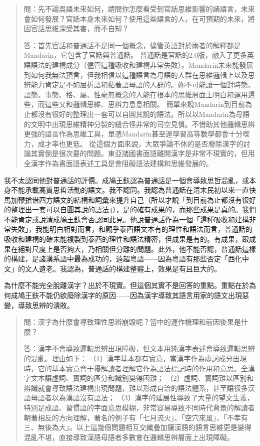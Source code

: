\documentclass[a5paper, 12pt, openany]{book} %
\begin{document}
\begin{quotation}
  問：先不論吳語未來如何，請問你怎麼看受到官話思維影響的諸語言，未來會如何發展？官話本身未來如何？使用這些語言的人，在可預期的未來，將因官話思維深受其害，而不自知？
  
  答：首先官話和普通話不是同一個概念，儘管英語對於兩者的解釋都是Mandarin，它包含了官話與普通話。
  普通話是官話的2.0版，融入了更多英語語法的建構成分（儘管這種吸收和建構非常失敗）。Mandarin未來能發展到如何我無法預言，但我相信以這種語言為母語的人群在思維邏輯上以及思辨能力肯定是不如屈折語和黏著語母語的人群的。妳不可能讓一個對時態、語態、事態、格、屬、性毫無概念的人能在根本的思維層面上明白和運用這些，而這些又和邏輯思維、思辨力息息相關。
  簡單來說Mandarin到目前為止都沒有很好的整理出一套可以自圓其說的語法。所以以Mandarin為母語的文明中出現思維精神分裂的縫合怪非常的司空見慣。不借助其他邏輯思辨更強的語言作為思維工具，單憑Mandarin甚至連學習高等數學都會十分喫力，成才率也更低。
  從這個方面來說，大眾爭論不休的是否廢除漢字的討論其實倒是很次要的問題。東亞諸國書面語離開漢字是非常不現實的，但用全漢字作為書面語表述工具是會阻礙語法建構和思維發展的。 
\end{quotation}

我不太認同他對普通話的評價。成鳩王鈇認為普通話是一個會導致思哲混亂，或本身不能承載高質思哲活動的語文。我不認同。我認為普通話在清末民初以來一直快馬加鞭搶借西方語文的結構和詞彙來提升自己（所以才說「到目前為止都沒有很好的整理出一套可以自圓其說的語法」），是的確有成果的，而那些成果是真的。我們不能肯定或說清成鳩王鈇會否認同此見。他說普通話作為一個「這種吸收和建構非常失敗」，我能明白相對而言，和觀乎泰西語文本有的理性和語法而言，普通話的吸收和建構的確未能複製到泰西的理性和語法精密，但成果是有的。有成果，跟成果在絕對尺度上是否夠大，乃相關但分離的問題。此外，他不能否認，普通話這樣的構建，是諸漢系語中最為成功的，遠超粵語——因為粵語有那些否定「西化中文」的文人遺老。我認為，普通話的構建整體上，效果是有且巨大的。

為什麼不能完全脫離漢字？出於不現實。但這個其實不是回答的重點。重點在於為何成鳩王鈇不能仍欲廢除漢字的原因——因為漢字導致其語言用家的語文出現惡變，導致思辨的潰敗。

\begin{quotation}
問：漢字為什麼會導致理性思辨崩毀呢？當中的運作機理和前因後果是什麼？

答：漢字不會導致邏輯思辨出現障礙，但文本用純漢字表述會導致邏輯思辨的混亂。理由如下：
（1）漢字基本都有實意，當漢字作為虛詞成分出現時，它的基本實意會干擾解讀者理解它作為語法標記時的作用和意思。全漢字文本讓虛詞、實詞的區分和識別變得困難；
（2）虛詞、實詞難以區別和辨識就會導致語法建構出現問題，難以形成自洽的語法體系，甚至讓很多漢語母語者以為漢語沒有語法；
（3）漢字的延展性導致了大量的望文生義，特別是成語、習慣語的字面意思模糊，非常容易導致不同時代背景的解讀者朝著相反的方向理解，著名的例子有「七月流火」、「空穴來風」、「不孝有三、無後為大」。以上這幾個問題相互交織疊加讓漢語的語言思維更是變得混亂不堪，直接導致漢語母語者多數會在邏輯思辨層面上出現障礙。 
\end{quotation}
\end{document}
